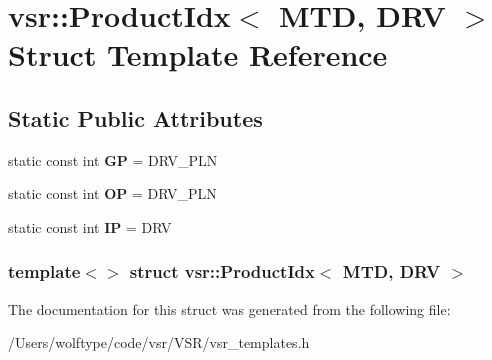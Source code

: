 \hypertarget{structvsr_1_1_product_idx_3_01_m_t_d_00_01_d_r_v_01_4}{\section{vsr\-:\-:Product\-Idx$<$ M\-T\-D, D\-R\-V $>$ Struct Template Reference}
\label{structvsr_1_1_product_idx_3_01_m_t_d_00_01_d_r_v_01_4}
}
\subsection*{Static Public Attributes}
\begin{DoxyCompactItemize}
\item 
\hypertarget{structvsr_1_1_product_idx_3_01_m_t_d_00_01_d_r_v_01_4_a1a75c7d06c6ecf51515d00efc00aae7d}{static const int {\bfseries G\-P} = D\-R\-V\-\_\-\-P\-L\-N}\label{structvsr_1_1_product_idx_3_01_m_t_d_00_01_d_r_v_01_4_a1a75c7d06c6ecf51515d00efc00aae7d}

\item 
\hypertarget{structvsr_1_1_product_idx_3_01_m_t_d_00_01_d_r_v_01_4_aeecfae9ac661355506ba86551baed6dd}{static const int {\bfseries O\-P} = D\-R\-V\-\_\-\-P\-L\-N}\label{structvsr_1_1_product_idx_3_01_m_t_d_00_01_d_r_v_01_4_aeecfae9ac661355506ba86551baed6dd}

\item 
\hypertarget{structvsr_1_1_product_idx_3_01_m_t_d_00_01_d_r_v_01_4_aef9ad2598c4047a8e9d262151750b20e}{static const int {\bfseries I\-P} = D\-R\-V}\label{structvsr_1_1_product_idx_3_01_m_t_d_00_01_d_r_v_01_4_aef9ad2598c4047a8e9d262151750b20e}

\end{DoxyCompactItemize}
\subsubsection*{template$<$$>$ struct vsr\-::\-Product\-Idx$<$ M\-T\-D, D\-R\-V $>$}



The documentation for this struct was generated from the following file\-:\begin{DoxyCompactItemize}
\item 
/\-Users/wolftype/code/vsr/\-V\-S\-R/vsr\-\_\-templates.\-h\end{DoxyCompactItemize}
